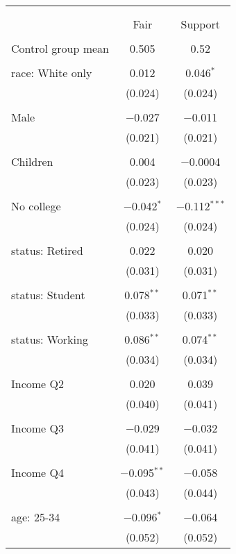 
\begin{tabular}{@{\extracolsep{5pt}}lcc} 
\\[-1.8ex]\hline 
\hline \\[-1.8ex] 
\\[-1.8ex] & Fair & Support \\ 
\hline \\[-1.8ex] 
 Control group mean & 0.505 & 0.52  \\ \hline \\[-1.8ex] race: White only & 0.012 & 0.046$^{*}$ \\ 
  & (0.024) & (0.024) \\ 
  & & \\ 
 Male & $-$0.027 & $-$0.011 \\ 
  & (0.021) & (0.021) \\ 
  & & \\ 
 Children & 0.004 & $-$0.0004 \\ 
  & (0.023) & (0.023) \\ 
  & & \\ 
 No college & $-$0.042$^{*}$ & $-$0.112$^{***}$ \\ 
  & (0.024) & (0.024) \\ 
  & & \\ 
 status: Retired & 0.022 & 0.020 \\ 
  & (0.031) & (0.031) \\ 
  & & \\ 
 status: Student & 0.078$^{**}$ & 0.071$^{**}$ \\ 
  & (0.033) & (0.033) \\ 
  & & \\ 
 status: Working & 0.086$^{**}$ & 0.074$^{**}$ \\ 
  & (0.034) & (0.034) \\ 
  & & \\ 
 Income Q2 & 0.020 & 0.039 \\ 
  & (0.040) & (0.041) \\ 
  & & \\ 
 Income Q3 & $-$0.029 & $-$0.032 \\ 
  & (0.041) & (0.041) \\ 
  & & \\ 
 Income Q4 & $-$0.095$^{**}$ & $-$0.058 \\ 
  & (0.043) & (0.044) \\ 
  & & \\ 
 age: 25-34 & $-$0.096$^{*}$ & $-$0.064 \\ 
  & (0.052) & (0.052) \\ 

\end{tabular}
